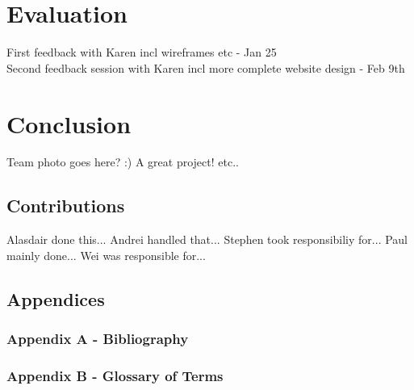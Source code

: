 \documentclass{l3proj}
\begin{document}
\chapter{Evaluation}

First feedback with Karen incl wireframes etc - Jan 25\\
Second feedback session with Karen incl more complete website design - Feb 9th

\chapter{Conclusion}

Team photo goes here? :)
A great project! etc..

\section{Contributions}

Alasdair done this...
Andrei handled that...
Stephen took responsibiliy for... 
Paul mainly done...
Wei was responsible for...	

\section{Appendices}
\subsection{Appendix A - Bibliography}
\label{sec:bibl}


\subsection{Appendix B - Glossary of Terms}
\label{sec:gloss}
\end{document}
